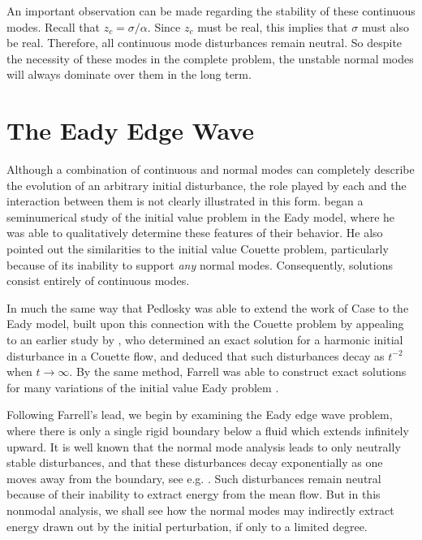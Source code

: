 \documentclass[letterpaper,11pt,onecolumn,twoside,titlepage]{article}
\begin{document}
An important observation can be made regarding the stability of these continuous modes. Recall that $z_c = \sigma / \alpha$. Since $z_c$ must be real, this implies that $\sigma$ must also be real. Therefore, all continuous mode disturbances remain neutral. So despite the necessity of these modes in the complete problem, the unstable normal modes will always dominate over them in the long term.


\section{The Eady Edge Wave}

Although a combination of continuous and normal modes can completely describe the evolution of an arbitrary initial disturbance, the role played by each and the interaction between them is not clearly illustrated in this form. \citet{Farrell:1982} began a seminumerical study of the initial value problem in the Eady model, where he was able to qualitatively determine these features of their behavior. He also pointed out the similarities to the initial value Couette problem, particularly because of its inability to support \emph{any} normal modes. Consequently, solutions consist entirely of continuous modes.

In much the same way that Pedlosky was able to extend the work of Case to the Eady model, \citet{Farrell:1984} built upon this connection with the Couette problem by appealing to an earlier study by \citet{Orr:1907}, who determined an exact solution for a harmonic initial disturbance in a Couette flow, and deduced that such disturbances decay as $t^{-2}$ when $t \rightarrow \infty$. By the same method, Farrell was able to construct exact solutions for many variations of the initial value Eady problem \citep{Farrell:1984, Farrell:1985}.

Following Farrell's lead, we begin by examining the Eady edge wave problem, where there is only a single rigid boundary below a fluid which extends infinitely upward. It is well known that the normal mode analysis leads to only neutrally stable disturbances, and that these disturbances decay exponentially as one moves away from the boundary, see e.g. \citet{Gill:1982}. Such disturbances remain neutral because of their inability to extract energy from the mean flow. But in this nonmodal analysis, we shall see how the normal modes may indirectly extract energy drawn out by the initial perturbation, if only to a limited degree.
\end{document}
